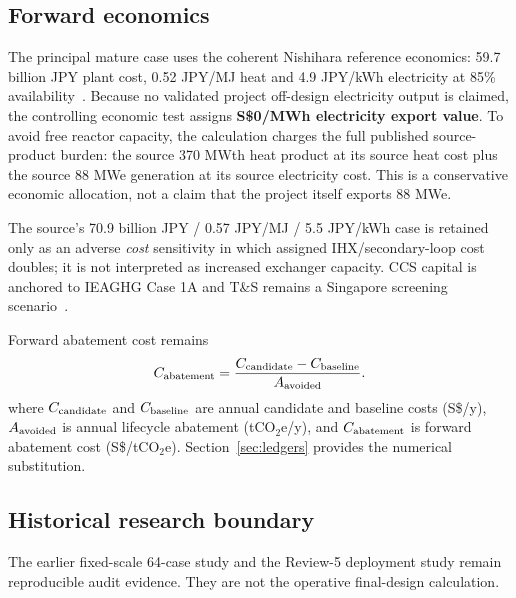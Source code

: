 \subsection{Forward economics}
The principal mature case uses the coherent Nishihara reference economics: 59.7 billion JPY plant cost, 0.52 JPY/MJ heat and 4.9 JPY/kWh electricity at 85\% availability~\cite{nishihara2007potential}. Because no validated project off-design electricity output is claimed, the controlling economic test assigns \textbf{S\$0/MWh electricity export value}. To avoid free reactor capacity, the calculation charges the full published source-product burden: the source 370 MWth heat product at its source heat cost plus the source 88 MWe generation at its source electricity cost. This is a conservative economic allocation, not a claim that the project itself exports 88 MWe.

The source's 70.9 billion JPY / 0.57 JPY/MJ / 5.5 JPY/kWh case is retained only as an adverse \emph{cost} sensitivity in which assigned IHX/secondary-loop cost doubles; it is not interpreted as increased exchanger capacity. CCS capital is anchored to IEAGHG Case 1A and T\&S remains a Singapore screening scenario~\cite{ieaghg2017smr,mticcs2025cost}.

Forward abatement cost remains
\begin{equation}\label{eq:abatement-cost-definition}
C_{\rm abatement}=\frac{C_{\rm candidate}-C_{\rm baseline}}{A_{\rm avoided}}.
\end{equation}
where $C_{\rm candidate}$ and $C_{\rm baseline}$ are annual candidate and baseline costs (S\$/y), $A_{\rm avoided}$ is annual lifecycle abatement (tCO$_2$e/y), and $C_{\rm abatement}$ is forward abatement cost (S\$/tCO$_2$e). Section~\ref{sec:ledgers} provides the numerical substitution.

\subsection{Historical research boundary}
The earlier fixed-scale 64-case study and the Review-5 deployment study remain reproducible audit evidence. They are not the operative final-design calculation.
